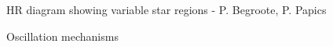HR diagram showing variable star regions - P. Begroote, P. Papics

Oscillation mechanisms










